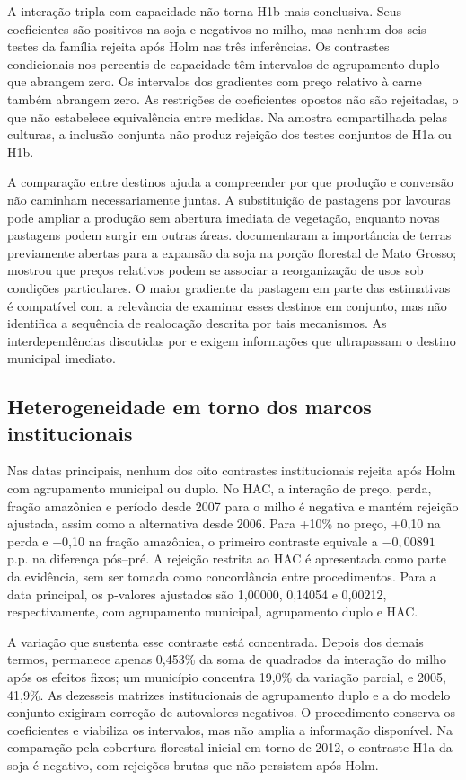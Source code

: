 A interação tripla com capacidade não torna H1b mais conclusiva. Seus coeficientes são positivos na soja e negativos no milho, mas nenhum dos seis testes da família rejeita após Holm nas três inferências. Os contrastes condicionais nos percentis de capacidade têm intervalos de agrupamento duplo que abrangem zero. Os intervalos dos gradientes com preço relativo à carne também abrangem zero. As restrições de coeficientes opostos não são rejeitadas, o que não estabelece equivalência entre medidas. Na amostra compartilhada pelas culturas, a inclusão conjunta não produz rejeição dos testes conjuntos de H1a ou H1b.

A comparação entre destinos ajuda a compreender por que produção e conversão não caminham necessariamente juntas. A substituição de pastagens por lavouras pode ampliar a produção sem abertura imediata de vegetação, enquanto novas pastagens podem surgir em outras áreas.  documentaram a importância de terras previamente abertas para a expansão da soja na porção florestal de Mato Grosso;  mostrou que preços relativos podem se associar a reorganização de usos sob condições particulares. O maior gradiente da pastagem em parte das estimativas é compatível com a relevância de examinar esses destinos em conjunto, mas não identifica a sequência de realocação descrita por tais mecanismos. As interdependências discutidas por  e  exigem informações que ultrapassam o destino municipal imediato.

\subsection{Heterogeneidade em torno dos marcos institucionais}

Nas datas principais, nenhum dos oito contrastes institucionais rejeita após Holm com agrupamento municipal ou duplo. No HAC, a interação de preço, perda, fração amazônica e período desde 2007 para o milho é negativa e mantém rejeição ajustada, assim como a alternativa desde 2006. Para +10\% no preço, +0,10 na perda e +0,10 na fração amazônica, o primeiro contraste equivale a $-0,00891$ p.p. na diferença pós--pré. A rejeição restrita ao HAC é apresentada como parte da evidência, sem ser tomada como concordância entre procedimentos. Para a data principal, os p-valores ajustados são 1,00000, 0,14054 e 0,00212, respectivamente, com agrupamento municipal, agrupamento duplo e HAC.

A variação que sustenta esse contraste está concentrada. Depois dos demais termos, permanece apenas 0,453\% da soma de quadrados da interação do milho após os efeitos fixos; um município concentra 19,0\% da variação parcial, e 2005, 41,9\%. As dezesseis matrizes institucionais de agrupamento duplo e a do modelo conjunto exigiram correção de autovalores negativos. O procedimento conserva os coeficientes e viabiliza os intervalos, mas não amplia a informação disponível. Na comparação pela cobertura florestal inicial em torno de 2012, o contraste H1a da soja é negativo, com rejeições brutas que não persistem após Holm.

